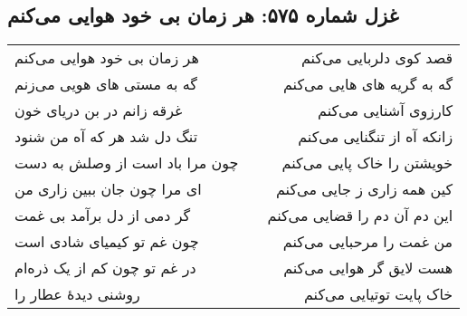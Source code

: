 \begin{center}
\section*{غزل شماره ۵۷۵: هر زمان بی خود هوایی می‌کنم}
\label{sec:575}
\begin{longtable}{l p{0.5cm} r}
هر زمان بی خود هوایی می‌کنم
&&
قصد کوی دلربایی می‌کنم
\\
گه به مستی های هویی می‌زنم
&&
گه به گریه های هایی می‌کنم
\\
غرقه زانم در بن دریای خون
&&
کارزوی آشنایی می‌کنم
\\
تنگ دل شد هر که آه من شنود
&&
زانکه آه از تنگنایی می‌کنم
\\
چون مرا باد است از وصلش به دست
&&
خویشتن را خاک پایی می‌کنم
\\
ای مرا چون جان ببین زاری من
&&
کین همه زاری ز جایی می‌کنم
\\
گر دمی از دل برآمد بی غمت
&&
این دم آن دم را قضایی می‌کنم
\\
چون غم تو کیمیای شادی است
&&
من غمت را مرحبایی می‌کنم
\\
در غم تو چون کم از یک ذره‌ام
&&
هست لایق گر هوایی می‌کنم
\\
روشنی دیدهٔ عطار را
&&
خاک پایت توتیایی می‌کنم
\\
\end{longtable}
\end{center}
